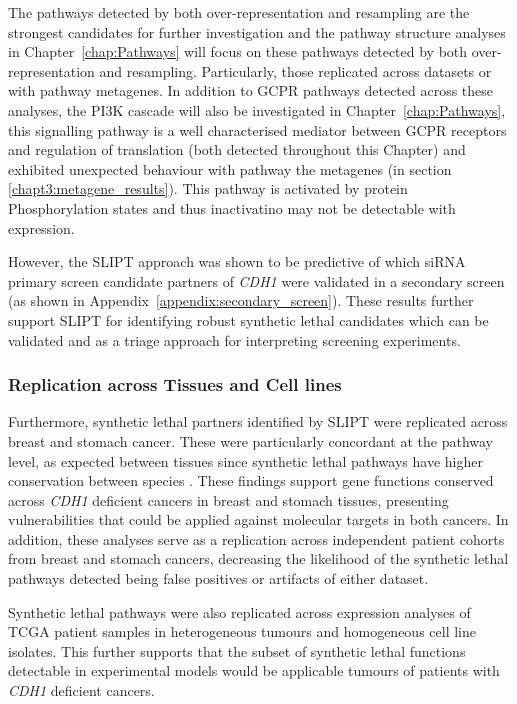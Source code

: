 The pathways detected by both over-represent\-ation and resampling are the strongest candidates for further investigation and the pathway structure analyses in Chapter~\ref{chap:Pathways} will focus on these pathways detected by both over-representation and resampling. Particularly, those replicated across datasets or with pathway metagenes. In addition to GCPR pathways detected across these analyses, the PI3K cascade will also be investigated in Chapter~\ref{chap:Pathways}, this signalling pathway is a well characterised mediator between GCPR receptors and regulation of translation \citep{Gao2015} (both detected throughout this Chapter) and exhibited unexpected behaviour with pathway the metagenes (in section \ref{chapt3:metagene_results}). This pathway is activated by protein Phosphorylation states and thus inactivatino may not be detectable with expression.

However, the SLIPT approach was shown to be predictive of which siRNA primary screen candidate partners of \textit{CDH1} were validated in a secondary screen (as shown in Appendix~\ref{appendix:secondary_screen}). These results further support SLIPT for identifying robust synthetic lethal candidates which can be validated and as a triage approach for interpreting screening experiments.

\subsubsection{Replication across Tissues and Cell lines}

Furthermore, synthetic lethal partners identified by SLIPT were replicated across breast and stomach cancer. These were particularly concordant at the pathway level, as expected between tissues since synthetic lethal pathways have higher conservation between species \citep{Dixon2008}. These findings support gene functions conserved across \textit{CDH1} deficient cancers in breast and stomach tissues, presenting vulnerabilities that could be applied against molecular targets in both cancers. In addition, these analyses serve as a replication across independent patient cohorts from breast and stomach cancers, decreasing the likelihood of the synthetic lethal pathways detected being false positives or artifacts of either dataset.

Synthetic lethal pathways were also replicated across expression analyses of TCGA patient samples in heterogeneous tumours and homogeneous cell line isolates. This further supports that the subset of synthetic lethal functions detectable in experimental models \citep{Chen2014, Telford2015} would be applicable tumours of patients with \textit{CDH1} deficient cancers.

